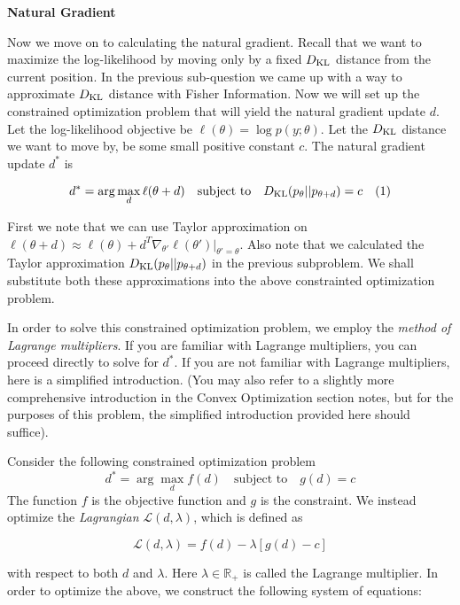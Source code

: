 \ifnum{} {
  \clearpage
} \fi
\item {} \textbf{Natural Gradient}

Now we move on to calculating the natural gradient. Recall that we want to maximize the log-likelihood by moving only by a fixed $D_{\text{KL}}$ distance from the current position. In the previous sub-question we came up with a way to approximate $D_{\text{KL}}$ distance with Fisher Information. Now we will set up the constrained optimization problem that will yield the natural gradient update $d$. Let the log-likelihood objective be $\ell(\theta) = \log p(y;\theta)$. Let the $D_{\text{KL}}$ distance we want to move by, be some small positive constant $c$. The natural gradient update $d^*$ is

\begin{align*}
d^* &= \arg\max_d \ell(\theta + d) \quad \text{subject to} \quad D_{\text{KL}}(p_\theta||p_{\theta + d}) = c & \text{(1)}
\end{align*}

First we note that we can use Taylor approximation on $\ell(\theta + d) \approx \ell(\theta) + d^T\nabla_{\theta'}\ell(\theta')|_{\theta'=\theta}$. Also note that we calculated the Taylor approximation $D_{\text{KL}}(p_\theta||p_{\theta+d})$ in the previous subproblem. We shall substitute both these approximations into the above constrainted optimization problem.

In order to solve this constrained optimization problem, we employ the \emph{method of Lagrange multipliers}. If you are familiar with Lagrange multipliers, you can proceed directly to solve for $d^*$. If you are not familiar with Lagrange multipliers, here is a simplified introduction. (You may also refer to a slightly more comprehensive introduction in the Convex Optimization section notes, but for the purposes of this problem, the simplified introduction provided here should suffice).

Consider the following constrained optimization problem
$$d^\ast =\arg\max_d f(d) \quad \text{subject to} \quad g(d)=c$$
The function $f$ is the objective function and $g$ is the constraint. We instead optimize the \emph{Lagrangian} $\mathcal{L}(d,\lambda)$, which is defined as

$$\mathcal{L}(d,\lambda) = f(d) - \lambda [ g(d)-c ]$$

with respect to both $d$ and $\lambda$. Here $\lambda \in \mathbb{R}_+$ is called the Lagrange multiplier. In order to optimize the above, we construct the following system of equations:


